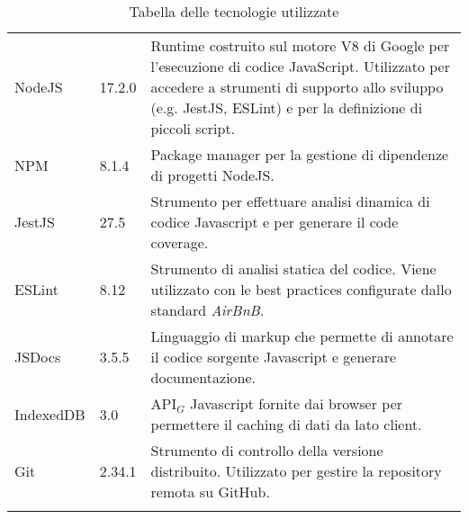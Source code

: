 {\begin{longtable}{|C{2.5cm}|C{2cm}|L{9cm}|}
   \\ \hline
  NodeJS       & 17.2.0    & Runtime costruito sul motore V8 di Google per l'esecuzione di codice JavaScript. Utilizzato per accedere a strumenti di supporto allo sviluppo (e.g. JestJS, ESLint) e per la definizione di piccoli script. \\  \hline
  NPM       & 8.1.4    & Package manager per la gestione di dipendenze di progetti NodeJS. \\  \hline
  JestJS       & 27.5    & Strumento per effettuare analisi dinamica di codice Javascript e per generare il code coverage. \\  \hline
  ESLint       & 8.12    & Strumento di analisi statica del codice. Viene utilizzato con le best practices configurate dallo standard \textit{AirBnB}. \\  \hline
  JSDocs       & 3.5.5    & Linguaggio di markup che permette di annotare il codice sorgente Javascript e generare documentazione. \\  \hline
  IndexedDB       & 3.0    & API$_G$ Javascript fornite dai browser per permettere il caching di dati da lato client. \\  \hline
  Git       & 2.34.1    & Strumento di controllo della versione distribuito. Utilizzato per gestire la repository remota su GitHub. \\  \hline
  \caption{Tabella delle tecnologie utilizzate}
\end{longtable}}

\renewcommand\arraystretch{1}
